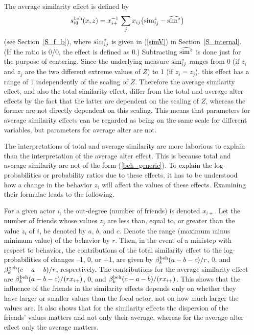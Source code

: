 \documentclass[a4paper,fleqn,11pt]{article}
\newcommand{\+}{\, + \,}
\newcommand{\vit}{\theenumi}
\begin{document}
The average similarity effect is defined by
\[ s^{\rm beh}_{i\vit}(x, z) = x_{i+}^{-1} \,
           \sum_j x_{ij} \big({\rm sim}^z_{ij} - \widehat{{\rm sim}^z}\big)
\]
(see Section~\ref{S_f_b}), where ${\rm sim}^z_{ij}$ is given in (\ref{simV})
in Section~\ref{S_internal}.
(If the ratio is 0/0, the effect is defined as 0.)
Subtracting $\widehat{{\rm sim}^z}$ is done just for the purpose
of centering.
Since the underlying measure ${\rm sim}^z_{ij}$ ranges from 0
(if $z_i$ and $z_j$ are the two different extreme values of $Z$)
to 1 (if $z_i = z_j$), this effect has a range of 1 independently
of the scaling of $Z$.
Therefore the average similarity effect, and also the total
similarity effect, differ from the total and average
alter effects by the fact that the latter are dependent on the scaling
of $Z$, whereas the former are not directly dependent on this scaling.
This means that parameters for average similarity effects can be regarded
as being on the same scale for different variables, but parameters
for average alter are not.
\medskip

The interpretations of total and average similarity are more laborious
to explain than the interpretation of the average alter effect.
This is because total and average similarity are not of the form
(\ref{beh_generic}). To explain the log-probabilities or probability ratios due to these
effects, it has to be understood how a change in the behavior $z_i$
will affect the values of these effects.
Examining their formulae leads to the following.

For a given actor $i$, the out-degree (number of friends) is denoted $x_{i+}$.
Let the number of friends whose values $z_j$ are less than, equal to,
or greater than the value $z_i $ of $i$, be denoted by $a$, $b$, and $c$.
Denote the range (maximum minus minimum value) of the behavior by $r$.
Then, in the event of a ministep with respect to behavior,
the contributions of the total similarity effect to the log-probabilities
of changes --1, 0, or +1, are given by $\beta^{\rm beh}_k(a-b-c)/r$,
0, and $\beta^{\rm beh}_k(c-a-b)/r$, respectively.
The contributions for the average similarity effect are
$\beta^{\rm beh}_k(a-b-c)/(rx_{i+})$,
0, and $\beta^{\rm beh}_k(c-a-b)/(rx_{i+})$.
This shows that the influence of the friends in the similarity effects
depends only on whether they have larger or smaller values than the focal actor,
not on how much larger the values are.
It also shows that for the similarity effects the dispersion of the
friends' values matters and not only their average,
whereas for the average alter effect only the average matters.
\end{document}
